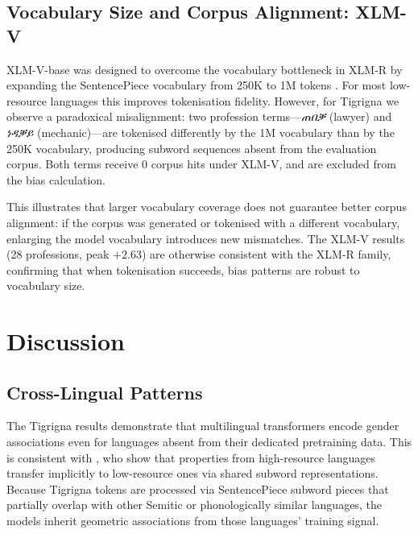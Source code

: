 \documentclass[10pt]{article}
\begin{document}
\subsection{Vocabulary Size and Corpus Alignment: XLM-V}
\label{sec:xlmv}

XLM-V-base was designed to overcome the vocabulary bottleneck in XLM-R by
expanding the SentencePiece vocabulary from 250K to 1M tokens
\citep{liang2023xlmv}. For most low-resource languages this improves
tokenisation fidelity. However, for Tigrigna we observe a paradoxical
misalignment: two profession terms---\textit{ጠበቓ} (lawyer) and
\textit{ነዳቓይ} (mechanic)---are tokenised differently by the 1M vocabulary
than by the 250K vocabulary, producing subword sequences absent from the
evaluation corpus. Both terms receive 0 corpus hits under XLM-V, and are
excluded from the bias calculation.

This illustrates that larger vocabulary coverage does not guarantee
better corpus alignment: if the corpus was generated or tokenised with a
different vocabulary, enlarging the model vocabulary introduces new
mismatches. The XLM-V results (28 professions, peak $+2.63$) are otherwise
consistent with the XLM-R family, confirming that when tokenisation succeeds,
bias patterns are robust to vocabulary size.

\section{Discussion}

\subsection{Cross-Lingual Patterns}

The Tigrigna results demonstrate that multilingual transformers encode
gender associations even for languages absent from their dedicated
pretraining data. This is consistent with \citet{lauscher2020zero}, who
show that properties from high-resource languages transfer implicitly to
low-resource ones via shared subword representations. Because Tigrigna
tokens are processed via SentencePiece subword pieces that partially overlap
with other Semitic or phonologically similar languages, the models inherit
geometric associations from those languages' training signal.
\end{document}
